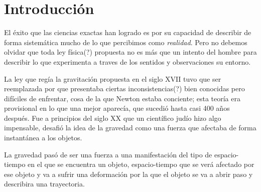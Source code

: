 \documentclass[11pt]{book}
\begin{document}
\newpage

\addtolength{\topmargin}{\MSup}



\tableofcontents
\cleardoublepage




\chapter{Introducción}


El éxito que las ciencias exactas han logrado es por su capacidad de describir de forma sistemática mucho de lo que percibimos como \emph{realidad}. Pero no debemos olvidar que toda ley física(?) propuesta no es más que un intento del hombre para describir lo que experimenta a traves de los sentidos y observaciones su entorno.

La ley que regía la gravitación propuesta en el siglo XVII tuvo que ser reemplazada por que presentaba ciertas inconsistencias(?) bien conocidas pero difíciles de enfrentar, cosa de la que Newton estaba conciente; esta teoría era provisional en lo que una mejor aparecía, que sucedió hasta casi 400 años después. Fue a principios del siglo XX que un científico judío hizo algo impensable, desafió la idea de la gravedad como una fuerza que afectaba de forma instantánea a los objetos. 


La gravedad pasó de ser una fuerza a una manifestación del tipo de espacio-tiempo en el que se encuentra un objeto, espacio-tiempo que se verá afectado por ese objeto y va a sufrir una deformación por la que el objeto se va a abrir paso y describira una trayectoria.
\end{document}
